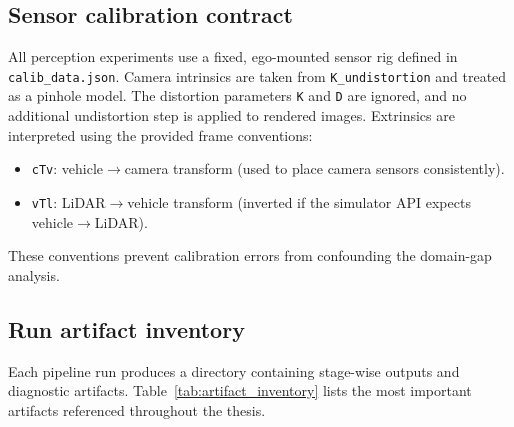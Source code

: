 \subsection{Sensor calibration contract}
\label{sec:appendix_sensors}
All perception experiments use a fixed, ego-mounted sensor rig defined in \texttt{calib\_data.json}. 
Camera intrinsics are taken from \texttt{K\_undistortion} and treated as a pinhole model. The distortion parameters \texttt{K} and \texttt{D} are ignored, and no additional undistortion step is applied to rendered images.
Extrinsics are interpreted using the provided frame conventions:
\begin{itemize}
\item \texttt{cTv}: vehicle$\rightarrow$camera transform (used to place camera sensors consistently).
\item \texttt{vTl}: LiDAR$\rightarrow$vehicle transform (inverted if the simulator API expects vehicle$\rightarrow$LiDAR).
\end{itemize}
These conventions prevent calibration errors from confounding the domain-gap analysis.

\subsection{Run artifact inventory}
\label{sec:appendix_artifacts}
Each pipeline run produces a directory containing stage-wise outputs and diagnostic artifacts. 
Table~\ref{tab:artifact_inventory} lists the most important artifacts referenced throughout the thesis.

